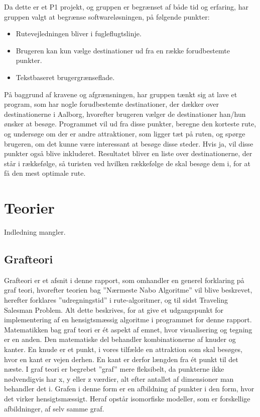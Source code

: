 Da dette er et P1 projekt, og gruppen er begrænset af både tid og erfaring, har gruppen valgt at begrænse softwareløsningen, på følgende punkter: 
\begin{itemize}
	\item Rutevejledningen bliver i fugleflugtslinje.
	\item Brugeren kan kun vælge destinationer ud fra en række forudbestemte punkter.
	\item Tekstbaseret brugergrænseflade.
\end{itemize}

På baggrund af kravene og afgrænsningen, har gruppen tænkt sig at lave et program, som har nogle forudbestemte destinationer, der dækker over destinationerne i Aalborg, hvorefter brugeren vælger de destinationer han/hun ønsker at besøge. Programmet vil ud fra disse punkter, beregne den korteste rute, og undersøge om der er andre attraktioner, som ligger tæt på ruten, og spørge brugeren, om det kunne være interessant at besøge disse steder. Hvis ja, vil disse punkter også blive inkluderet. Resultatet bliver en liste over destinationerne, der står i rækkefølge, så turisten ved hvilken rækkefølge de skal besøge dem i, for at få den mest optimale rute.

\section{Teorier}
Indledning mangler.

\subsection{Grafteori}
Grafteori er et afsnit i denne rapport, som omhandler en generel forklaring på graf teori, hvorefter teorien bag ”Nærmeste Nabo Algoritme” vil blive beskrevet, herefter forklares ”udregningstid” i rute-algoritmer, og til sidst Traveling Salesman Problem. Alt dette beskrives, for at give et udgangspunkt for implementering af en hensigtsmæssig algoritme i programmet for denne rapport.\newline
Matematikken bag graf teori er ét aspekt af emnet, hvor visualisering og tegning er en anden. Den matematiske del behandler kombinationerne af knuder og kanter. En knude er et punkt, i vores tilfælde en attraktion som skal besøges, hvor en kant er vejen derhen. En kant er derfor længden fra ét punkt til det næste.
I graf teori er begrebet ”graf” mere fleksibelt, da punkterne ikke nødvendigvis har x, y eller z værdier, alt efter antallet af dimensioner man behandler det i. Grafen i denne form er en afbildning af punkter i den form, hvor det virker hensigtsmæssigt. Heraf opstår isomorfiske modeller, som er forskellige afbildninger, af selv samme graf. 

